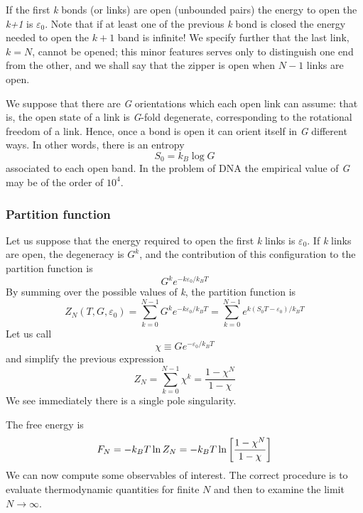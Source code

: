 \documentclass[../main/main.tex]{subfiles}
\begin{document}
If the first \emph{k} bonds (or links) are open (unbounded pairs) the energy to open the \emph{k+1} is \( \varepsilon _0 \). Note that if at least one of the previous \emph{k} bond is closed the energy needed to open the \( k+1 \) band is infinite! 
We specify further that the last link, \(k=N\), cannot be opened; this minor features serves only to distinguish one end from the other, and we shall say that the zipper is open when \(N-1\) links are open. 

We suppose that there are \emph{G} orientations which each open link can assume: that is, the open state of a link is \emph{G}-fold degenerate, corresponding to the rotational freedom of a link. Hence, once a bond is open it can orient itself in \emph{G} different ways. In other words, there is an entropy
\begin{equation}
  S_0 = k_B \log{G}
\end{equation}
associated to each open band. 
In the problem of DNA the empirical value of \emph{G} may be of the order of \(10^4\).

\subsubsection{Partition function}
Let us suppose that the energy required to open the first \emph{k} links is \(\varepsilon_0\). If \emph{k} links are open, the degeneracy is \(G^k\), and the contribution of this configuration to the partition function is 
\begin{equation*}
  G^k e^{-k \varepsilon _0/k_B T}
\end{equation*}
By summing over the possible values of \emph{k}, the partition function is
\begin{equation}
  Z_N (T,G, \varepsilon _0) = \sum_{k=0}^{N-1}  G^k e^{-k \varepsilon _0/k_B T} = \sum_{k=0}^{N-1} e^{k(S_0 T - \varepsilon _0)/k_B T}
\end{equation}
Let us call
\begin{equation}
  \chi \equiv G e^{-\varepsilon _0/k_B T}
\end{equation}
and simplify the previous expression
\begin{equation}
  Z_N = \sum_{k=0}^{N-1} \chi ^k = \frac{1-\chi^N}{1-\chi}
\end{equation}
We see immediately there is a single pole singularity.

The free energy is
\begin{equation}
  F_N = -k_B T \ln{Z_N} = -k_B T \ln{\qty[\frac{1-\chi^N}{1-\chi}]}
\end{equation}
We can now compute some observables of interest.
The correct procedure is to evaluate thermodynamic quantities for finite \(N\) and then to examine the limit \( N \rightarrow \infty\).
\end{document}
